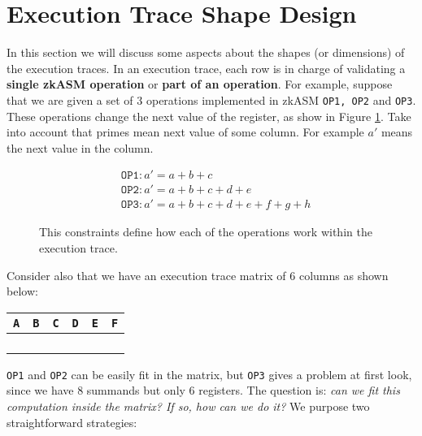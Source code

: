 



\section{Execution Trace Shape Design}

In this section we will discuss some aspects about the shapes (or dimensions) of the execution traces. In an execution trace, each row is in charge of validating a \textbf{single zkASM operation} or \textbf{part of an operation}. For example, suppose that we are given a set of $3$ operations implemented in zkASM \texttt{OP1, OP2} and \texttt{OP3}. These operations change the next value of the \A register, as show in Figure \ref{fig:operations}. Take into account that primes mean next value of some column. For example $a'$ means the next value in the \A column.

\begin{figure}[H]
\begin{align*}\label{eq:op-effects}
&\texttt{OP1}: a'=a+b+c \\
&\texttt{OP2}: a'=a+b+c+d+e\\
&\texttt{OP3}: a'=a+b+c+d+e+f+g+h
\end{align*}
\caption{This constraints define how each of the operations work within the execution trace. }
\label{fig:operations}
\end{figure}

Consider also that we have an execution trace matrix of $6$ columns as shown below:
\begin{table}[h!]
\centering
\begin{tabular}{|c|c|c|c|c|c|}
\hline
\texttt{A} & \texttt{B} & \texttt{C} & \texttt{D} & \texttt{E} & \texttt{F} \\ \hline
&  &  & & &\\ \hline
&  &  &  &  &  \\ \hline
&  &  &  &  & \\ \hline
&  &  &&& \\ \hline
\end{tabular}
\end{table}

\texttt{OP1} and \texttt{OP2} can be easily fit in the matrix, but \texttt{OP3} gives a problem at first look, since we have 8 summands but only 6 registers. The question is: \textit{can we fit this computation inside the matrix? If so, how can we do it?} We purpose two straightforward strategies:

